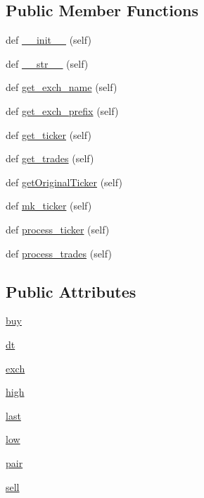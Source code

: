 \subsection*{Public Member Functions}
\begin{DoxyCompactItemize}
\item 
def \hyperlink{classexchange_1_1_fox_bit_a1f892137668748287116d902ef668d1a}{\+\_\+\+\_\+init\+\_\+\+\_\+} (self)
\item 
def \hyperlink{classexchange_1_1_fox_bit_ac21d1d06bf748dfd22ca35bc56a72e3b}{\+\_\+\+\_\+str\+\_\+\+\_\+} (self)
\item 
def \hyperlink{classexchange_1_1_fox_bit_a9bb3b48ee388b422f1d27c1774f0c9bf}{get\+\_\+exch\+\_\+name} (self)
\item 
def \hyperlink{classexchange_1_1_fox_bit_a091fb1b6e76b392b0a018a411f9da200}{get\+\_\+exch\+\_\+prefix} (self)
\item 
def \hyperlink{classexchange_1_1_fox_bit_aeb98818ddef05bb1beff5b55231d3760}{get\+\_\+ticker} (self)
\item 
def \hyperlink{classexchange_1_1_fox_bit_a80807753c2c595997857d097939c9283}{get\+\_\+trades} (self)
\item 
def \hyperlink{classexchange_1_1_fox_bit_adfca60ed33245c7bd9666893f6725bb9}{get\+Original\+Ticker} (self)
\item 
def \hyperlink{classexchange_1_1_fox_bit_a149b379722f351e0b890822a6220f0b0}{mk\+\_\+ticker} (self)
\item 
def \hyperlink{classexchange_1_1_fox_bit_a813481c37754cc0c6e0b1cefa0ec0889}{process\+\_\+ticker} (self)
\item 
def \hyperlink{classexchange_1_1_fox_bit_a244f81e91b04a1118d2d17f6c8497cb5}{process\+\_\+trades} (self)
\end{DoxyCompactItemize}
\subsection*{Public Attributes}
\begin{DoxyCompactItemize}
\item 
\hyperlink{classexchange_1_1_fox_bit_acb7e709cc05e8314b1bdacd32e4dfc80}{buy}
\item 
\hyperlink{classexchange_1_1_fox_bit_a363f8488eb0423f88519c085ae6f168f}{dt}
\item 
\hyperlink{classexchange_1_1_fox_bit_a3922433dcfe54e39c3c0da12fa252658}{exch}
\item 
\hyperlink{classexchange_1_1_fox_bit_a4f6dfaecbcc17ceadddf52d266d9c00d}{high}
\item 
\hyperlink{classexchange_1_1_fox_bit_a5cdbc327b005014dc3b8bb6fb54a12fd}{last}
\item 
\hyperlink{classexchange_1_1_fox_bit_acd666444cff98fe477651120ddb0f915}{low}
\item 
\hyperlink{classexchange_1_1_fox_bit_abfd6daf1cbad94eb74bba4c97fe4a574}{pair}
\item 
\hyperlink{classexchange_1_1_fox_bit_ac1fae4ef7a43254b71d7173a5cc6eeaf}{sell}
\end{DoxyCompactItemize}
